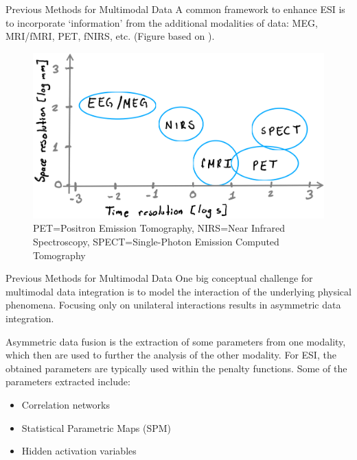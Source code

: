 \documentclass[progressbar=head]{beamer}
\begin{document}
\begin{frame}{Previous Methods for Multimodal Data}
A common framework
to enhance ESI is to incorporate 
`information' from the additional \alert{modalities} of data:
%
MEG, MRI/fMRI\cite{he2008multimodal, huster2012methods}, PET, fNIRS\cite{fnirs}, etc.
(Figure based on \cite{he2008multimodal}).
\begin{figure}
\centering
\includegraphics[width=0.65\linewidth]{./img_oldbeamer/sketch07}
\caption{PET=Positron Emission Tomography, NIRS=Near Infrared Spectroscopy, SPECT=Single-Photon Emission Computed Tomography}
\end{figure}
\end{frame}

\begin{frame}{Previous Methods for Multimodal Data}
One big conceptual challenge for multimodal data integration is to model the interaction of the underlying physical phenomena. 
%
Focusing only on unilateral interactions results in asymmetric data integration.


\alert{Asymmetric data fusion} is the extraction of some parameters from one modality, which then are used to further the analysis of the other modality.
%
For ESI, the obtained parameters are typically used within the penalty functions.
Some of the parameters extracted include:
\begin{itemize}
    \item Correlation networks
    \item Statistical Parametric Maps (SPM)
    \item Hidden activation variables \cite{fire}
\end{itemize}

\end{frame}
\end{document}

